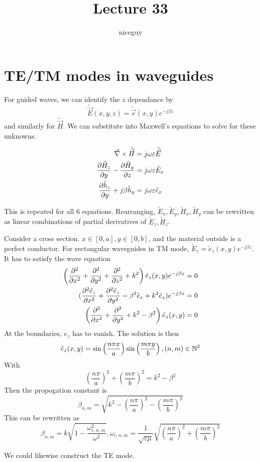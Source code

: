 \documentclass[12pt]{article}
\title{Lecture 33}
\author{niceguy}
\begin{document}
\maketitle

\section{TE/TM modes in waveguides}

For guided waves, we can identify the $z$ dependance by
$$\tilde{\vec E}(x,y,z) = \tilde{\vec e}(x,y)e^{-j\beta z}$$
and similarly for $\tilde{\vec H}$. We can substitute into Maxwell's equations to solve for these unknowns.

\begin{align*}
    \vec\nabla \times \tilde{\vec H} &= j\omega\varepsilon \tilde{\vec E} \\
    \frac{\partial \tilde H_z}{\partial y} - \frac{\partial \tilde H_y}{\partial z} &= j\omega\varepsilon \tilde E_x \\
    \frac{\partial \tilde h_z}{\partial y} + j\beta\tilde h_y &= j\omega\varepsilon \tilde e_x
\end{align*}

This is repeated for all 6 equations. Rearranging, $\tilde E_x, \tilde E_y, \tilde H_x, \tilde H_y$ can be rewritten as linear combinations of partial derivatives of $\tilde E_z, \tilde H_z$.

\begin{ex}
    Consider a cross section. $x \in [0,a], y \in [0,b]$, and the material outside is a perfect conductor. For rectangular waveguides in TM mode, $\tilde E_z = \tilde e_z(x,y)e^{-j\beta z}$. It has to satisfy the wave equation
    \begin{align*}
        \left(\frac{\partial ^2}{\partial x^2} + \frac{\partial ^2}{\partial y^2} + \frac{\partial ^2}{\partial z^2} + k^2\right) \tilde e_z(x,y)e^{-j\beta z} &= 0 \\
        (\frac{\partial ^2\tilde e_z}{\partial x^2} + \frac{\partial ^2\tilde e_z}{\partial y^2} - \beta^2\tilde e_z + k^2\tilde e_z)e^{-j\beta z} &= 0 \\
        \left(\frac{\partial ^2}{\partial x^2} + \frac{\partial ^2}{\partial y^2} + k^2 - \beta^2 \right) \tilde e_z(x,y) &= 0
    \end{align*}
    At the boundaries, $e_z$ has to vanish. The solution is then
    $$\tilde e_z(x,y) = \sin\left(\frac{n\pi x}{a}\right)\sin\left(\frac{m\pi y}{b}\right), (n,m) \in \mathbb{N}^2$$
    With
    $$\left(\frac{n\pi}{a}\right)^2 + \left(\frac{m\pi}{b}\right)^2 = k^2 - \beta^2$$
    Then the propogation constant is
    $$\beta_{n,m} = \sqrt{k^2 - \left(\frac{n\pi}{a}\right)^2 - \left(\frac{m\pi}{b}\right)^2}$$
    This can be rewritten as
    $$\beta_{n,m} = k \sqrt{1 - \frac{\omega_{c,n,m}^2}{\omega^2}}, \omega_{c,n,m} = \frac{1}{\sqrt{\varepsilon\mu}} \sqrt{\left(\frac{n\pi}{a}\right)^2 + \left(\frac{m\pi}{b}\right)^2}$$
\end{ex}

We could likewise construct the TE mode.
\end{document}
